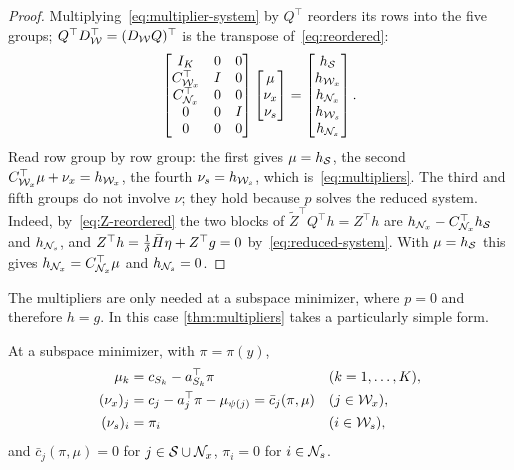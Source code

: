 \begin{proof}
Multiplying~\eqref{eq:multiplier-system} by $Q^\top$ reorders its rows into the five groups;
$Q^\top D_{\mathcal{W}}^\top = (D_{\mathcal{W}} Q)^\top$ is the transpose of~\eqref{eq:reordered}:
\[
\begin{bmatrix}
I_K & 0 & 0\\
C_{\mathcal{W}_x}^\top & I & 0\\
C_{\mathcal{N}_x}^\top & 0 & 0\\
0 & 0 & I\\
0 & 0 & 0
\end{bmatrix}
\begin{bmatrix}\mu\\ \nu_x\\ \nu_s\end{bmatrix}
=
\begin{bmatrix} h_{\mathcal{S}}\\ h_{\mathcal{W}_x}\\ h_{\mathcal{N}_x}\\ h_{\mathcal{W}_s}\\ h_{\mathcal{N}_s}\end{bmatrix}.
\]
Read row group by row group: the first gives $\mu = h_{\mathcal{S}}$, the second
$C_{\mathcal{W}_x}^\top\mu + \nu_x = h_{\mathcal{W}_x}$, the fourth $\nu_s = h_{\mathcal{W}_s}$, which is~\eqref{eq:multipliers}.
The third and fifth groups do not involve $\nu$; they hold because $p$ solves the reduced
system. Indeed, by~\eqref{eq:Z-reordered} the two blocks of $\tilde Z^\top Q^\top h = Z^\top h$ are
$h_{\mathcal{N}_x} - C_{\mathcal{N}_x}^\top h_{\mathcal{S}}$ and $h_{\mathcal{N}_s}$, and
$Z^\top h = \frac{1}{\delta}\bar{H}\eta + Z^\top g = 0$ by~\eqref{eq:reduced-system}. With
$\mu = h_{\mathcal{S}}$ this gives $h_{\mathcal{N}_x} = C_{\mathcal{N}_x}^\top\mu$ and $h_{\mathcal{N}_s} = 0$.
\end{proof}

The multipliers are only needed at a subspace minimizer, where $p = 0$ and therefore $h = g$.
In this case \cref{thm:multipliers} takes a particularly simple form.

\begin{cor} \label{cor:multipliers-minimizer}
At a subspace minimizer, with $\pi = \pi(y)$,
\begin{align*}
\mu_k &= c_{S_k} - a_{S_k}^\top\pi && (k = 1,\dots,K),\\
(\nu_x)_j &= c_j - a_j^\top\pi - \mu_{\psi(j)} = \bar c_j(\pi,\mu) && (j\in\mathcal{W}_x),\\
(\nu_s)_i &= \pi_i && (i\in\mathcal{W}_s),
\end{align*}
and $\bar c_j(\pi,\mu) = 0$ for $j\in\mathcal{S}\cup\mathcal{N}_x$, $\pi_i = 0$ for $i\in\mathcal{N}_s$.
\end{cor}

